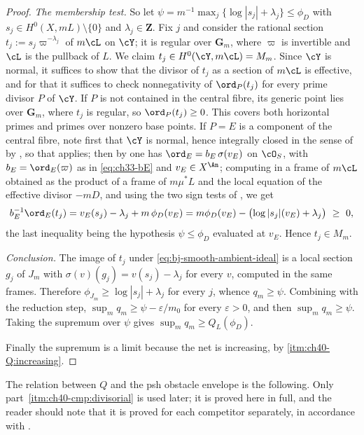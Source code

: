 \begin{proof}
\emph{The membership test.}  So let
$\psi=m^{-1}\max_j\{\log|s_j|+\lambda_j\}\le\phi_D$ with
$s_j\in H^0(X,mL)\setminus\{0\}$ and $\lambda_j\in\mathbf Z$.  Fix
$j$ and consider the rational section
$t_j:=s_j\varpi^{-\lambda_j}$ of $m\cL$ on $\cY$; it is regular over
$\mathbf G_m$, where $\varpi$ is invertible and $\cL$ is the pullback
of $L$.  We claim $t_j\in H^0(\cY,m\cL)=M_m$.  Since $\cY$ is normal,
it suffices to show that the divisor of $t_j$ as a section of $m\cL$ is
effective, and for that it suffices to check nonnegativity of
$\ord_P(t_j)$ for every prime divisor $P$ of $\cY$.  If $P$ is not contained in the central fibre, its generic point lies
over $\mathbf G_m$, where $t_j$ is regular, so $\ord_P(t_j)\ge0$.
This covers both horizontal primes and primes over nonzero base points.  If $P=E$ is a component of the central fibre, note first that $\cY$
is normal, hence integrally closed in the sense of
 by
, so that
 applies; then by
 one has $\ord_E=b_E\,\sigma(v_E)$ on
$\cO_S$, with $b_E=\ord_E(\varpi)$ as in \eqref{eq:ch33-bE} and
$v_E\in X^{\An}$; computing in a frame of $m\cL$ obtained as the product
of a frame of $m\mu^*L$ and the local equation of the effective divisor
$-mD$, and using the two sign tests of , we get
\[
 b_E^{-1}\ord_E(t_j)
 =v_E(s_j)-\lambda_j+m\,\phi_D(v_E)
 =m\phi_D(v_E)-\bigl(\log|s_j|(v_E)+\lambda_j\bigr)\ \ge\ 0,
\]
the last inequality being the hypothesis $\psi\le\phi_D$ evaluated at
$v_E$.  Hence $t_j\in M_m$.

\emph{Conclusion.}  The image of $t_j$ under
\eqref{eq:bj-smooth-ambient-ideal} is a local section $g_j$ of $J_m$
with $\sigma(v)(g_j)=v(s_j)-\lambda_j$ for every $v$, computed in the
same frames.  Therefore
$\phi_{J_m}\ge\log|s_j|+\lambda_j$ for every $j$, whence
$q_m\ge\psi$.  Combining with the reduction step,
$\sup_mq_m\ge\psi-\varepsilon/m_0$ for every $\varepsilon>0$, and then
$\sup_mq_m\ge\psi$.  Taking the supremum over $\psi$ gives
$\sup_mq_m\ge Q_L(\phi_D)$.

Finally the supremum is a limit because the net is increasing, by
\cref{itm:ch40-Q:increasing}.
\end{proof}

The relation between $Q$ and the psh obstacle envelope is the following.
Only part~\cref{itm:ch40-cmp:divisorial} is used later; it is proved here in
full, and the reader should note that it is proved for each competitor
separately, in accordance with .

